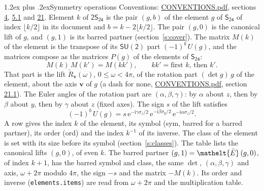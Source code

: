 \documentclass[10pt,a4paper]{article}
\makeatletter
\renewcommand\section{\@startsection{section}{1}{\z@}{-3ex plus -1ex minus -.2ex}%
  {1.2ex plus .2ex}{\normalfont\large\sffamily\bfseries\color{parttitle}}}
\numberwithin{equation}{section}
\newcommand{\eltfont}[1]{{\let\sigma\eltsigma\mathelt{#1}}}
\newcommand{\grp}[1]{\mathsf{#1}}
\newcommand{\elt}[1]{\eltfont{#1}}
\newcommand{\vv}{\mathbf{v}}
\newcommand{\iunit}{\mathrm{i}}
\newcommand{\expe}{\mathrm{e}}
\newcommand{\barred}[1]{\bar{#1}}
\newcommand{\lift}[1]{\tilde{#1}}
\newcommand{\pauli}[1]{\sigma_{#1}}
\makeatother
\begin{document}
\section{Symmetry operations}\label{s:elements}
Conventions: \href{../../CONVENTIONS.pdf}{CONVENTIONS.pdf}, sections \href{../../../rotation/CONVENTIONS.pdf\#conv.4}{4}, \href{../../../rotation/CONVENTIONS.pdf\#conv.5.1}{5.1} and \href{../../CONVENTIONS.pdf\#conv.21}{21}.
\leavevmode\label{n:index.element}\label{n:element.g}Element $k$ of $\grp{2S_{24}}$ is the pair $(g, b)$ of the element $g$ of \href{../../../rotation/data/pdf/S24.pdf}{$\grp{S_{24}}$} of index $\lfloor k/2\rfloor$ in its document and $b = k - 2\lfloor k/2\rfloor$. The pair $(g, 0)$ is the canonical lift of $g$, and $(g, 1)$ is its barred partner (section~\ref{s:cover}). \label{n:matrix.element.pin}\label{n:matrix.element}The matrix $M(k)$ of the element is the transpose of its $\grp{SU(2)}$ part $(-1)^{b}\,U(g)$, and the matrices compose as the matrices $P(g)$ of the elements of $\grp{S_{24}}$:
\begin{equation}\label{e:mprod}M(k)\,M(k') = M(kk'),\qquad kk' = \text{first } k\text{, then } k'.\end{equation}
\leavevmode\label{n:angle.omega}\label{n:vector.axis}\label{n:vector.pole}That part is the lift $\lift{R}_{\vv}(\omega)$, $0 \le \omega < 4\pi$, of the rotation part $(\det g)\,g$ of the element, about the axis $\vv$ of $g$ (a dash for none, \href{../../CONVENTIONS.pdf}{CONVENTIONS.pdf}, section \href{../../CONVENTIONS.pdf\#conv.21.1}{21.1}). \label{n:angle.euler.alpha}\label{n:angle.euler.beta}\label{n:angle.euler.gamma}\label{n:vector.coordinates}The Euler angles of the rotation part are $(\alpha,\beta,\gamma)$: by $\alpha$ about $z$, then by $\beta$ about $y$, then by $\gamma$ about $z$ (fixed axes). \label{n:local.euler.sign}The sign $s$ of the lift satisfies
\begin{equation}\label{e:euler}(-1)^{b}\,U(g) = s\,\expe^{-\iunit\gamma\pauli{z}/2}\,\expe^{-\iunit\beta\pauli{y}/2}\,\expe^{-\iunit\alpha\pauli{z}/2}.\end{equation}
\leavevmode\label{n:index.element.inverse}\label{n:head.sym}\label{n:head.ord}A row gives the index $k$ of the element, its symbol (sym, barred for a barred partner), its order (ord) and the index $k^{-1}$ of its inverse. \label{n:head.class}The class of the element is set with its size before its symbol (section~\ref{s:classes}).
The table lists the canonical lifts $(g, 0)$, of even $k$. The barred partner $(g, 1) = \elt{\barred{E}}\,(g, 0)$, of index $k + 1$, has the barred symbol and class, the same $\det$, $(\alpha,\beta,\gamma)$ and axis, $\omega + 2\pi$ modulo $4\pi$, the sign $-s$ and the matrix $-M(k)$. Its order and inverse (\texttt{elements.items}) are read from $\omega + 2\pi$ and the multiplication table.
\end{document}
